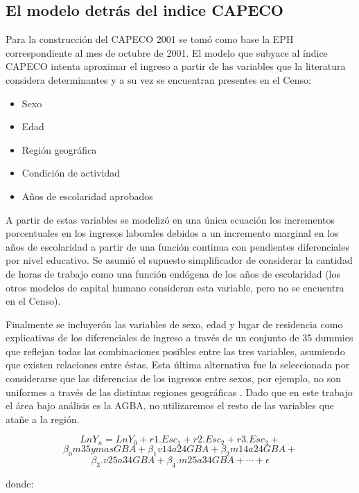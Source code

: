 \subsection{El modelo detrás del indice CAPECO} \label{cap2-modeloCapeco}

Para la construcción del CAPECO 2001 se tomó como base la EPH correspondiente al mes de octubre de 2001. El modelo que subyace al índice CAPECO intenta aproximar el ingreso a partir de las variables que la literatura considera determinantes y a su vez se encuentran presentes en el Censo: 

\begin{itemize}
	\item Sexo 
	\item Edad
	\item Región geográfica
	\item Condición de actividad
	\item Años de escolaridad aprobados
\end{itemize}

A partir de estas variables se modelizó en una única ecuación los incrementos porcentuales en los ingresos laborales debidos a un incremento marginal en los años de escolaridad a partir de una función continua con pendientes diferenciales por nivel educativo. Se asumió el supuesto simplificador de considerar la cantidad de horas de trabajo como una función endógena de los años de escolaridad (los otros modelos de capital humano consideran esta variable, pero no se encuentra en el Censo).

Finalmente se incluyerón las variables de sexo, edad y lugar de residencia como explicativas de los diferenciales de ingreso a través de un conjunto de 35 dummies que reflejan todas las
combinaciones posibles entre las tres variables, asumiendo que existen relaciones entre
éstas. Esta última alternativa fue la seleccionada por considerarse que las diferencias de
los ingresos entre sexos, por ejemplo, no son uniformes a través de las distintas regiones
geográficas \cite{indec2004}. Dado que en este trabajo el área bajo análisis es la AGBA, no utilizaremos el resto de las variables que atañe a la región.

$$Ln Y_n = Ln Y_0 + r1. Esc_1 + r2. Esc_2 + r3. Esc_3 + $$
$$ \beta_0 m35ymas GBA + \beta_1 v14a24 GBA+ \beta_2 m14a24GBA + $$
$$\beta_3. v25a34 GBA+ \beta_4. m25a34GBA + \cdots + \epsilon $$

donde:

